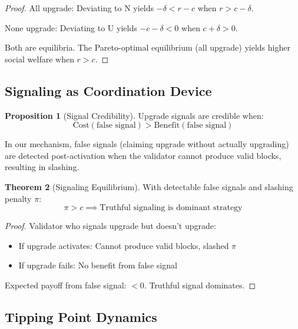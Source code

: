\documentclass[11pt,a4paper]{article}
\theoremstyle{definition}
\newtheorem{theorem}{Theorem}[section]
\newtheorem{proposition}[theorem]{Proposition}
\theoremstyle{remark}
\begin{document}
\begin{proof}
All upgrade: Deviating to N yields $-\delta < r - c$ when $r > c - \delta$.

None upgrade: Deviating to U yields $-c - \delta < 0$ when $c + \delta > 0$.

Both are equilibria. The Pareto-optimal equilibrium (all upgrade) yields higher social welfare when $r > c$.
\end{proof}

\subsection{Signaling as Coordination Device}

\begin{proposition}[Signal Credibility]
Upgrade signals are credible when:
\begin{equation}
    \text{Cost}(\text{false signal}) > \text{Benefit}(\text{false signal})
\end{equation}
\end{proposition}

In our mechanism, false signals (claiming upgrade without actually upgrading) are detected post-activation when the validator cannot produce valid blocks, resulting in slashing.

\begin{theorem}[Signaling Equilibrium]
With detectable false signals and slashing penalty $\pi$:
\begin{equation}
    \pi > c \implies \text{Truthful signaling is dominant strategy}
\end{equation}
\end{theorem}

\begin{proof}
Validator who signals upgrade but doesn't upgrade:
\begin{itemize}
    \item If upgrade activates: Cannot produce valid blocks, slashed $\pi$
    \item If upgrade fails: No benefit from false signal
\end{itemize}

Expected payoff from false signal: $< 0$.
Truthful signal dominates.
\end{proof}

\subsection{Tipping Point Dynamics}
\end{document}
